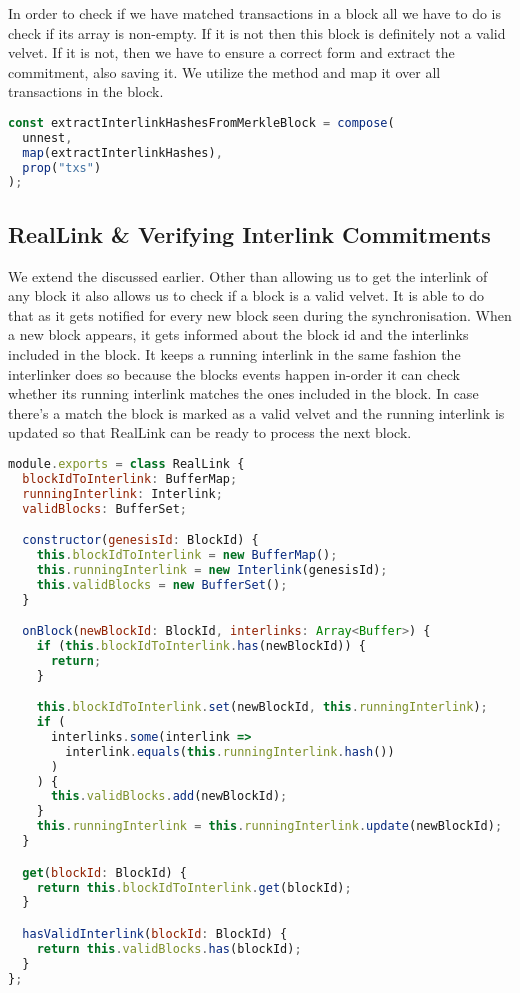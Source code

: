 In order to check if we have matched transactions in a block all we have to do is check if its  array is non-empty. If it is not then this block is definitely not a valid velvet. If it is not, then we have to ensure a correct form and extract the commitment, also saving it. We utilize the method  and map it over all transactions in the block.

\begin{lstlisting}[language=Javascript]
const extractInterlinkHashesFromMerkleBlock = compose(
  unnest,
  map(extractInterlinkHashes),
  prop("txs")
);
\end{lstlisting}

\subsection{RealLink \& Verifying Interlink Commitments}
We extend the  discussed earlier. Other than allowing us to get the interlink of any block it also allows us to check if a block is a valid velvet. It is able to do that as it gets notified for every new block seen during the synchronisation. When a new block appears, it gets informed about the block id and the interlinks included in the block. It keeps a running interlink in the same fashion the interlinker does so because the blocks events happen in-order it can check whether its running interlink matches the ones included in the block. In case there's a match the block is marked as a valid velvet and the running interlink is updated so that RealLink can be ready to process the next block.

\begin{lstlisting}[language=Javascript]
module.exports = class RealLink {
  blockIdToInterlink: BufferMap;
  runningInterlink: Interlink;
  validBlocks: BufferSet;

  constructor(genesisId: BlockId) {
    this.blockIdToInterlink = new BufferMap();
    this.runningInterlink = new Interlink(genesisId);
    this.validBlocks = new BufferSet();
  }

  onBlock(newBlockId: BlockId, interlinks: Array<Buffer>) {
    if (this.blockIdToInterlink.has(newBlockId)) {
      return;
    }

    this.blockIdToInterlink.set(newBlockId, this.runningInterlink);
    if (
      interlinks.some(interlink =>
        interlink.equals(this.runningInterlink.hash())
      )
    ) {
      this.validBlocks.add(newBlockId);
    }
    this.runningInterlink = this.runningInterlink.update(newBlockId);
  }

  get(blockId: BlockId) {
    return this.blockIdToInterlink.get(blockId);
  }

  hasValidInterlink(blockId: BlockId) {
    return this.validBlocks.has(blockId);
  }
};
\end{lstlisting}

